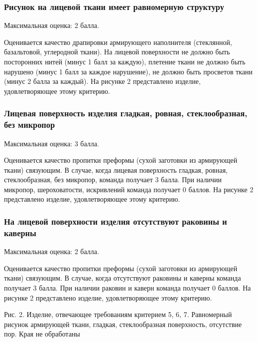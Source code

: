 \subsubsection*{Рисунок на лицевой ткани имеет равномерную структуру}

Максимальная оценка: 2 балла.

Оценивается качество драпировки армирующего наполнителя (стеклянной, базальтовой, углеродной ткани). На лицевой поверхности не должно быть посторонних нитей (минус 1 балл за каждую), плетение ткани не должно быть нарушено (минус 1 балл за каждое нарушение), не должно быть просветов ткани (минус 2 балла за каждый). На рисунке 2 представлено изделие, удовлетворяющее этому критерию.

\subsubsection*{Лицевая поверхность изделия гладкая, ровная, стеклообразная, без микропор}

Максимальная оценка: 3 балла.

Оценивается качество пропитки преформы (сухой заготовки из армирующей ткани) связующим. В случае, когда лицевая поверхность гладкая, ровная, стеклообразная, без микропор, команда получает 3 балла. При наличии микропор, шероховатости, искривлений команда получает 0 баллов. На рисунке 2 представлено изделие, удовлетворяющее этому критерию.

\subsubsection*{На лицевой поверхности изделия отсутствуют раковины и каверны}

Максимальная оценка: 2 балла.

Оценивается качество пропитки преформы (сухой заготовки из армирующей ткани) связующим. В случае, когда отсутствуют раковины и каверны команда получает 3 балла. При наличии раковин и каверн команда получает 0 баллов. На рисунке 2 представлено изделие, удовлетворяющее этому критерию.


\begin{center}
    Рис. 2. Изделие, отвечающее требованиям критерием 5, 6, 7. Равномерный рисунок армирующей ткани, гладкая, стеклообразная поверхность, отсутствие пор. Края не обработаны
\end{center}

